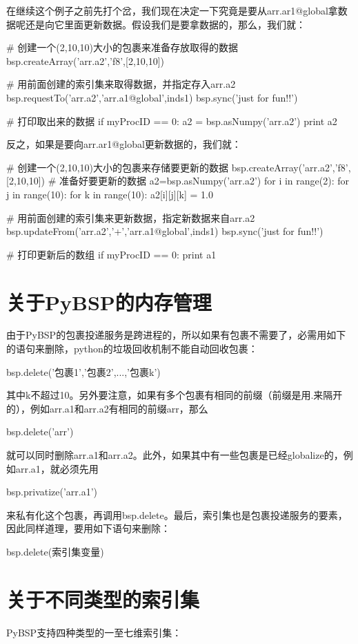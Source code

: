 \documentclass{article}
\begin{document}
在继续这个例子之前先打个岔，我们现在决定一下究竟是要从arr.ar1@global拿数据呢还是向它里面更新数据。假设我们是要拿数据的，那么，我们就：
\begin{python}
# 创建一个(2,10,10)大小的包裹来准备存放取得的数据
bsp.createArray('arr.a2','f8',[2,10,10])

# 用前面创建的索引集来取得数据，并指定存入arr.a2
bsp.requestTo('arr.a2','arr.a1@global',inds1)
bsp.sync('just for fun!!')

# 打印取出来的数据
if myProcID == 0:
    a2 = bsp.asNumpy('arr.a2')
    print a2
\end{python}
反之，如果是要向arr.ar1@global更新数据的，我们就：
\begin{python}
# 创建一个(2,10,10)大小的包裹来存储要更新的数据
bsp.createArray('arr.a2','f8',[2,10,10])
# 准备好要更新的数据
a2=bsp.asNumpy('arr.a2')
for i in range(2):
    for j in range(10):
        for k in range(10):
            a2[i][j][k] = 1.0

# 用前面创建的索引集来更新数据，指定新数据来自arr.a2
bsp.updateFrom('arr.a2','+','arr.a1@global',inds1)
bsp.sync('just for fun!!')

# 打印更新后的数组
if myProcID == 0:
    print a1
\end{python}

\section{关于PyBSP的内存管理}
由于PyBSP的包裹投递服务是跨进程的，所以如果有包裹不需要了，必需用如下的语句来删除，python的垃圾回收机制不能自动回收包裹：
\begin{python}
bsp.delete('包裹1','包裹2',...,'包裹k')
\end{python}
其中k不超过10。另外要注意，如果有多个包裹有相同的前缀（前缀是用.来隔开的），例如arr.a1和arr.a2有相同的前缀arr，那么
\begin{python}
bsp.delete('arr')
\end{python}
就可以同时删除arr.a1和arr.a2。此外，如果其中有一些包裹是已经globalize的，例如arr.a1，就必须先用
\begin{python}
bsp.privatize('arr.a1')
\end{python}
来私有化这个包裹，再调用bsp.delete。最后，索引集也是包裹投递服务的要素，因此同样道理，要用如下语句来删除：
\begin{python}
bsp.delete(索引集变量)
\end{python}

\section{关于不同类型的索引集}
PyBSP支持四种类型的一至七维索引集：
\end{document}
